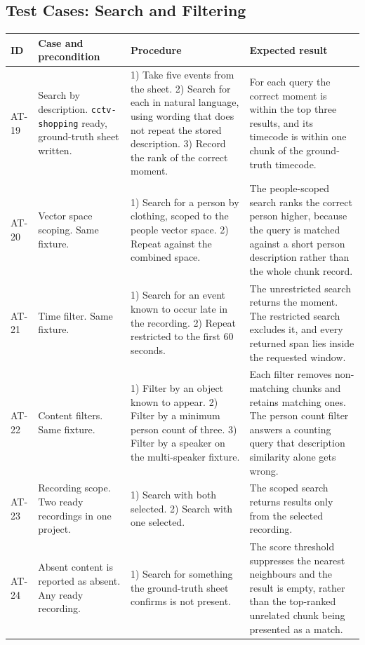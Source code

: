 \subsection{Test Cases: Search and Filtering}

\begin{table}[htbp]
\centering
\footnotesize
\begin{tabularx}{\textwidth}{@{}L{0.9cm}L{3.2cm}XX@{}}
\toprule
\textbf{ID} & \textbf{Case and precondition} & \textbf{Procedure} & \textbf{Expected result} \\
\midrule

AT-19 & Search by description. \texttt{cctv-shopping} ready, ground-truth sheet written. &
1) Take five events from the sheet. 2) Search for each in natural language, using
wording that does not repeat the stored description. 3) Record the rank of the correct
moment. &
For each query the correct moment is within the top three results, and its timecode is
within one chunk of the ground-truth timecode. \\

AT-20 & Vector space scoping. Same fixture. &
1) Search for a person by clothing, scoped to the people vector space. 2) Repeat against
the combined space. &
The people-scoped search ranks the correct person higher, because the query is matched
against a short person description rather than the whole chunk record. \\

AT-21 & Time filter. Same fixture. &
1) Search for an event known to occur late in the recording. 2) Repeat restricted to the
first 60 seconds. &
The unrestricted search returns the moment. The restricted search excludes it, and every
returned span lies inside the requested window. \\

AT-22 & Content filters. Same fixture. &
1) Filter by an object known to appear. 2) Filter by a minimum person count of three. 3)
Filter by a speaker on the multi-speaker fixture. &
Each filter removes non-matching chunks and retains matching ones. The person count
filter answers a counting query that description similarity alone gets wrong. \\

AT-23 & Recording scope. Two ready recordings in one project. &
1) Search with both selected. 2) Search with one selected. &
The scoped search returns results only from the selected recording. \\

AT-24 & Absent content is reported as absent. Any ready recording. &
1) Search for something the ground-truth sheet confirms is not present. &
The score threshold suppresses the nearest neighbours and the result is empty, rather
than the top-ranked unrelated chunk being presented as a match. \\


\end{tabularx}
\end{table}
